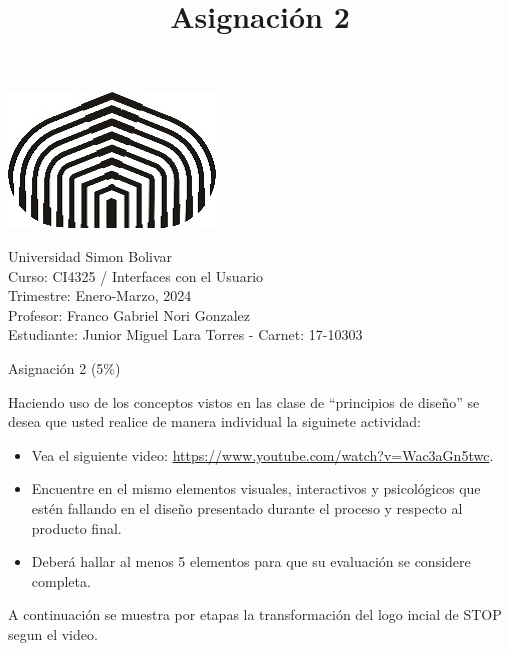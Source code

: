 \documentclass[a4paper,12pt]{article}
\title{Asignación 2}
\begin{document}
\begin{center}
\par \includegraphics[scale=1]{USB} \par
Universidad Simon Bolivar \\ Curso: CI4325 / Interfaces con el Usuario \\ Trimestre: Enero-Marzo, 2024 \\ Profesor: Franco Gabriel Nori Gonzalez \\ Estudiante: Junior Miguel Lara Torres - Carnet: 17-10303 \\
\end{center}

\begin{center}
Asignación 2 (5\%)
\end{center}

	Haciendo uso de los conceptos vistos en las clase de “principios de diseño” se desea que usted realice de manera individual la siguinete actividad:

\begin{itemize}
\item Vea el siguiente video: \url{https://www.youtube.com/watch?v=Wac3aGn5twc}.
\item Encuentre en el mismo elementos visuales, interactivos y psicológicos que estén fallando en el diseño presentado durante el proceso y respecto al producto final.

\item Deberá hallar al menos 5 elementos para que su evaluación se considere completa.
\end{itemize}

	A continuación se muestra por etapas la transformación del logo incial de STOP segun el video. \\
\end{document}
